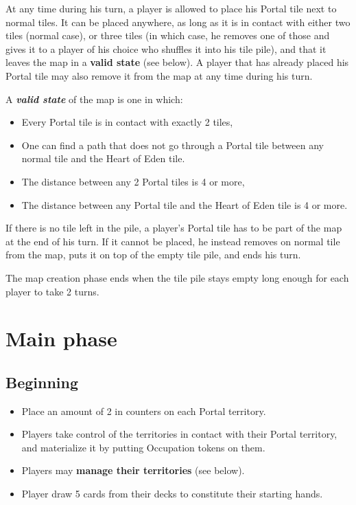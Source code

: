 \documentclass[a4paper]{article}
\begin{document}
    At any time during his turn, a player is allowed to place his Portal tile
    next to normal tiles.
    It can be placed anywhere, as long as it is in contact with either two tiles
    (normal case), or three tiles (in which case, he removes one of those and gives
    it to a player of his choice who shuffles it into his tile pile),
    and that it leaves the map in a \textbf{valid state} (see below).
    A player that has already placed his Portal tile may also remove it from the map at
    any time during his turn.    
    
    A \textbf{\textit{valid state}} of the map is one in which:
    \vspace{-1.3em}
    \begin{itemize}
        \item Every Portal tile is in contact with exactly 2 tiles,
        \item One can find a path that does not go through a Portal tile between
        any normal tile and the Heart of Eden tile.
        \item The distance between any 2 Portal tiles is 4 or more,
        \item The distance between any Portal tile and the Heart of Eden tile
        is 4 or more.
    \end{itemize}
    
    \vspace{-0.7em}
    If there is no tile left in the pile, a player's Portal tile has to be part of the
    map at the end of his turn.
    If it cannot be placed, he instead removes on normal tile from the map, puts it on
    top of the empty tile pile, and ends his turn.
    
    The map creation phase ends when the tile pile stays empty long enough for each
    player to take 2 turns.


\newpage
\section{Main phase}

  \subsection{Beginning}
  
  	\begin{itemize}
        \item Place an amount of 2 in counters on each Portal territory.
        \item Players take control of the territories in contact with their Portal
        territory, and materialize it by putting Occupation tokens on them.
        \item Players may \textbf{manage their territories} (see below).
        \item Player draw 5 cards from their decks to constitute their starting hands.
    \end{itemize}
\end{document}
